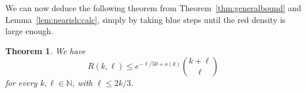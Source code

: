 \documentclass[12pt,reqno]{amsart}
\newtheorem{theorem}{Theorem}[section]
\theoremstyle{definition}
\theoremstyle{remark}
\newcommand\N{\mathbb{N}}
\renewcommand{\le}{\leqslant}
\def\N{\mathbb{N}}
\begin{document}

We can now deduce the following theorem from Theorem~\ref{thm:generalbound} and Lemma~\ref{lem:nearish:calc}, simply by taking blue steps until the red density is large enough. 

 
\begin{theorem}\label{thm:off:diagonal:nearer}
We have
$$R(k,\ell) \le e^{-\ell/50 + o(k)} {k + \ell \choose \ell}$$
for every $k,\ell \in \N$, with $\ell \le 2k/3$.
\end{theorem} 
 
\end{document}

